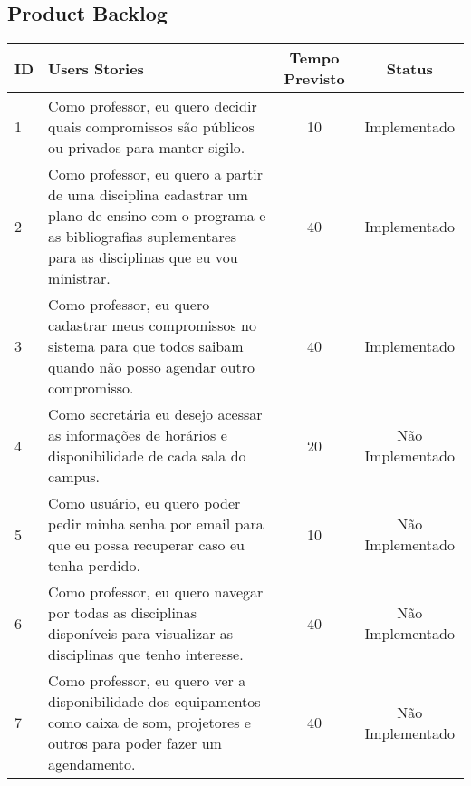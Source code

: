 \setlength{\arrayrulewidth}{1.4pt}
\begin{landscape}
	\chapter{Product Backlog}
		\begin{longtable}{|p{0.5in}|p{6in}|c|c|}
		
		\hline
		  {\bf ID} & {\bf Users Stories} & {\bf Tempo Previsto} & {\bf Status} \\
	
		\hline \rowcolor{cImplementado}
		         1 & Como professor, eu quero decidir quais compromissos são públicos ou privados para manter sigilo. &         10 & Implementado \\
		
		\hline \rowcolor{cImplementado}
		         2 & Como professor, eu quero a partir de uma disciplina cadastrar um plano de ensino com o programa e as bibliografias suplementares para as disciplinas que eu vou ministrar. &         40 & Implementado \\
		
		\hline \rowcolor{cImplementado}
		         3 & Como professor, eu quero cadastrar meus compromissos no sistema para que todos saibam quando não posso agendar outro compromisso. &         40 & Implementado \\
		\hline \rowcolor{cNaoImplementado}
		         4 & Como secretária eu desejo acessar as informações de horários e disponibilidade de cada sala do campus.  &         20 & Não Implementado \\
		
		\hline  \rowcolor{cNaoImplementado}
		         5 & Como usuário, eu quero poder pedir minha senha por email para que eu possa recuperar caso eu tenha perdido. &         10 & Não Implementado \\
		
		\hline \rowcolor{cNaoImplementado}
		         6 & Como professor, eu quero navegar por todas as disciplinas disponíveis para visualizar as disciplinas que tenho interesse.  &         40 & Não Implementado \\
		
		\hline \rowcolor{cNaoImplementado}
		         7 & Como professor, eu quero ver a disponibilidade dos equipamentos como caixa de som, projetores e outros para poder fazer um agendamento. &         40 & Não Implementado \\
		

\end{longtable}
\end{landscape}
